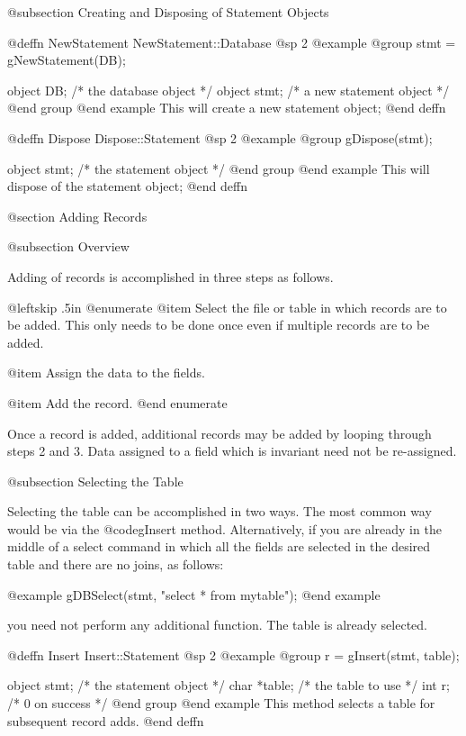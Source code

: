 @subsection Creating and Disposing of Statement Objects


@deffn {NewStatement}  NewStatement::Database
@sp 2
@example
@group
stmt = gNewStatement(DB);

object  DB;     /*  the database object      */
object  stmt;   /*  a new statement object   */
@end group
@end example
This will create a new statement object;
@end deffn



@deffn {Dispose}  Dispose::Statement
@sp 2
@example
@group
gDispose(stmt);

object  stmt;   /*  the statement object   */
@end group
@end example
This will dispose of the statement object;
@end deffn



@section Adding Records

@subsection Overview

Adding of records is accomplished in three steps as follows.

{@leftskip .5in
@enumerate
@item
Select the file or table in which records are to be added.  This only
needs to be done once even if multiple records are to be added.

@item
Assign the data to the fields.

@item
Add the record.
@end enumerate
}

Once a record is added, additional records may be added by looping through
steps 2 and 3.  Data assigned to a field which is invariant need not be
re-assigned.

@subsection Selecting the Table

Selecting the table can be accomplished in two ways.  The most common way would be
via the @code{gInsert} method.  Alternatively, if you are already in the middle of a select
command in which all the fields are selected in the desired table and there are no
joins, as follows:

@example
gDBSelect(stmt, "select * from mytable");
@end example

you need not perform any additional function.  The table is already selected.

@deffn {Insert}  Insert::Statement
@sp 2
@example
@group
r = gInsert(stmt, table);

object  stmt;   /*  the statement object  */
char    *table; /*  the table to use      */
int     r;      /*  0 on success          */
@end group
@end example
This method selects a table for subsequent record adds.
@end deffn


